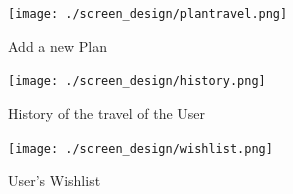 \documentclass[11pt]{article}
\begin{document}
\begin{figure}[ht!]
\hfill\texttt{[image: ./screen\_design/plantravel.png]}\hspace*{\fill}
\caption{Add a new Plan}
\end{figure}

\begin{figure}[ht!]
\hfill\texttt{[image: ./screen\_design/history.png]}\hspace*{\fill}
\caption{History of the travel of the User}
\end{figure}

\begin{figure}[ht!]
\hfill\texttt{[image: ./screen\_design/wishlist.png]}\hspace*{\fill}
\caption{User's Wishlist}
\end{figure}
\end{document}
